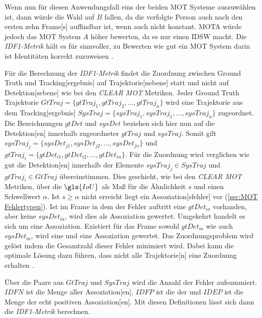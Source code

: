 Wenn nun für diesen Anwendungsfall eins der beiden \gls{MOT} Systeme auszuwählen ist, dann würde die Wahl auf \(B\) fallen, da die verfolgte Person auch nach den ersten zehn \gls{Frame}[s] auffindbar ist, wenn auch nicht konstant. \gls{MOTA} würde jedoch das \gls{MOT} System \(A\) höher bewerten, da es nur einen \gls{IDSW} macht. Die \textit{\gls{IDF1}-Metrik} hält es für sinnvoller, zu Bewerten wie gut ein \gls{MOT} System darin ist Identitäten korrekt zuzuweisen \cite{IDF1}. \par

Für die Berechnung der \textit{\gls{IDF1}-Metrik} findet die Zuordnung zwischen \gls{Ground Truth} und \gls{Tracking}[ergebnis] auf \gls{Trajektorie}[nebene] statt und nicht auf \gls{Detektion}[sebene] wie bei den \textit{\acrshort{CLEAR} \gls{MOT}} Metriken. Jeder \gls{Ground Truth} \gls{Trajektorie} \(GtTraj = \{gtTraj_1, gtTraj_2, \dots, gtTraj_n\}\) wird eine \gls{Trajektorie} aus dem \gls{Tracking}[ergebnis] \(SysTraj = \{sysTraj_1, sysTraj_1, \dots, sysTraj_n\}\) zugeordnet. Die Bezeichnungen \(gtDet\) und \(sysDet\) beziehen sich hier nun auf die \gls{Detektion}[en] innerhalb zugeordneter \(gtTraj\) und \(sysTraj\). Somit gilt \(sysTraj_j = \{sysDet_{j1}, sysDet_{j2}, \dots, sysDet_{jn}\}\) und \(gtTraj_i = \{gtDet_{i1}, gtDet_{i2}, \dots, gtDet_{in}\}\). Für die Zuordnung wird verglichen wie gut die \gls{Detektion}[en] innerhalb der Elemente \(sysTraj_j \in SysTraj\) und \(gtTraj_i \in GtTraj\) übereinstimmen. Dies geschieht, wie bei den \textit{\acrshort{CLEAR} \gls{MOT}} Metriken, über die \(\gls{IoU}\) als Maß für die Ähnlichkeit \(s\) und einen Schwellwert \(\alpha\). Ist \(s \geq \alpha\) nicht erreicht liegt ein \gls{Assoziation}[sfehler] vor (\autoref{sec:MOT Fehlertypen}). Ist im \gls{Frame} in dem der Fehler auftritt eine \(gtDet_{ia}\) vorhanden, aber keine \(sysDet_{ia}\), wird dies als  \gls{Assoziation} gewertet. Umgekehrt handelt es sich um eine  \gls{Assoziation}. Existiert für das \gls{Frame} sowohl \(gtDet_{ia}\) wie auch \(sysDet_{ia}\), wird eine  und eine  \gls{Assoziation} gewertet. Das Zuordnungsproblem wird gelöst indem die Gesamtzahl dieser Fehler minimiert wird. Dabei kann die optimale Lösung dazu führen, dass nicht alle \gls{Trajektorie}[n] eine Zuordnung erhalten \cite{IDF1}. \par

Über die Paare aus \(GtTraj\) und \(SysTraj\) wird die Anzahl der Fehler aufsummiert. \(IDFN\) ist die Menge aller  \gls{Assoziation}[en], \(IDFP\) ist die der  und \(IDEP\) ist die Menge der echt positiven \gls{Assoziation}[en]. Mit diesen Definitionen lässt sich dann die \textit{\gls{IDF1}-Metrik} berechnen. 

